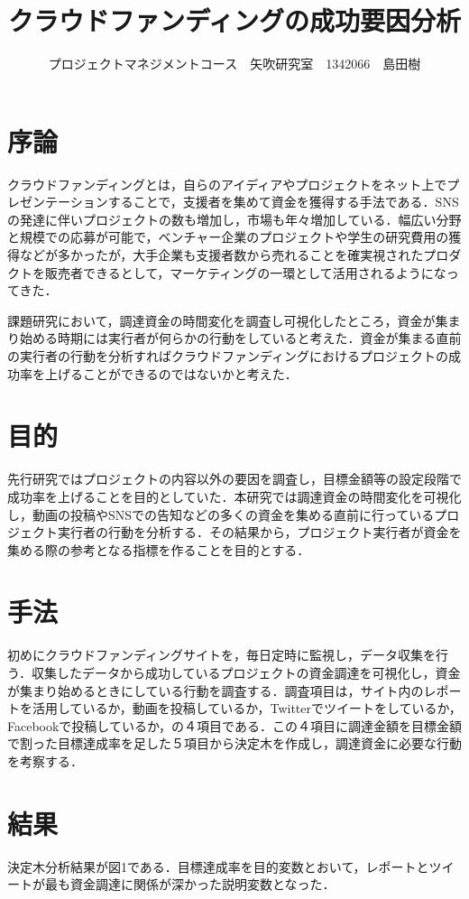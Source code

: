\documentclass[uplatex,twocolumn,dvipdfmx]{jsarticle}
\title{\vspace{-5mm}\fontsize{14pt}{0pt}\selectfont クラウドファンディングの成功要因分析}
\author{\normalsize プロジェクトマネジメントコース　矢吹研究室　1342066　島田樹}
\date{}
\begin{document}
\fontsize{10.5pt}{\baselineskip}\selectfont
\maketitle





\section{序論}
クラウドファンディング\cite{wiki}とは，自らのアイディアやプロジェクトをネット上でプレゼンテーションすることで，支援者を集めて資金を獲得する手法である．SNSの発達に伴いプロジェクトの数も増加し，市場も年々増加している\cite{visualizing}．幅広い分野と規模での応募が可能で，ベンチャー企業のプロジェクトや学生の研究費用の獲得などが多かったが，大手企業も支援者数から売れることを確実視されたプロダクトを販売者できるとして，マーケティングの一環として活用されるようになってきた．

課題研究において，調達資金の時間変化を調査し可視化したところ，資金が集まり始める時期には実行者が何らかの行動をしていると考えた．資金が集まる直前の実行者の行動を分析すればクラウドファンディングにおけるプロジェクトの成功率を上げることができるのではないかと考えた．


\section{目的}
先行研究ではプロジェクトの内容以外の要因を調査し，目標金額等の設定段階で成功率を上げることを目的としていた．本研究では調達資金の時間変化を可視化し，動画の投稿やSNSでの告知などの多くの資金を集める直前に行っているプロジェクト実行者の行動を分析する．その結果から，プロジェクト実行者が資金を集める際の参考となる指標を作ることを目的とする．


\section{手法}
初めにクラウドファンディングサイトを，毎日定時に監視し，データ収集を行う．収集したデータから成功しているプロジェクトの資金調達を可視化し，資金が集まり始めるときにしている行動を調査する．調査項目は，サイト内のレポートを活用しているか，動画を投稿しているか，Twitterでツイートをしているか，Facebookで投稿しているか，の４項目である．この４項目に調達金額を目標金額で割った目標達成率を足した５項目から決定木を作成し，調達資金に必要な行動を考察する．


\section{結果}
決定木分析結果が図1である．目標達成率を目的変数とおいて，レポートとツイートが最も資金調達に関係が深かった説明変数となった．
\end{document}
